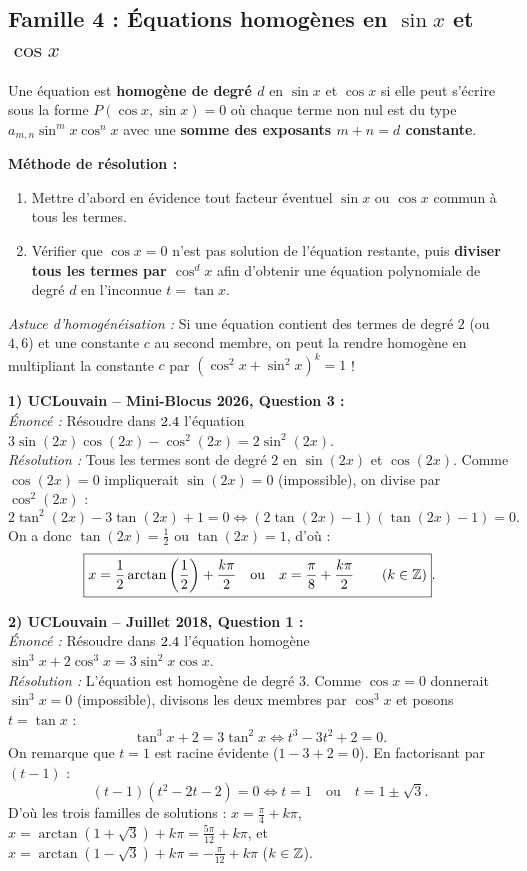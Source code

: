 \subsection{Famille 4 : Équations homogènes en $\sin x$ et $\cos x$}

\begin{definition}
Une équation est \textbf{homogène de degré $d$} en $\sin x$ et $\cos x$ si elle peut s'écrire sous la forme $P(\cos x, \sin x) = 0$ où chaque terme non nul est du type $a_{m,n} \sin^m x \cos^n x$ avec une \textbf{somme des exposants $m + n = d$ constante}.

\textbf{Méthode de résolution :}
\begin{enumerate}
    \item Mettre d'abord en évidence tout facteur éventuel $\sin x$ ou $\cos x$ commun à tous les termes.
    \item Vérifier que $\cos x = 0$ n'est pas solution de l'équation restante, puis \textbf{diviser tous les termes par $\cos^d x$} afin d'obtenir une équation polynomiale de degré $d$ en l'inconnue $t = \tan x$.
\end{enumerate}
\emph{Astuce d'homogénéisation :} Si une équation contient des termes de degré $2$ (ou $4, 6$) et une constante $c$ au second membre, on peut la rendre homogène en multipliant la constante $c$ par $(\cos^2 x + \sin^2 x)^k = 1$ !
\end{definition}

\begin{exemple}
\textbf{1) UCLouvain -- Mini-Blocus 2026, Question 3 :}\\
\emph{Énoncé :} Résoudre dans $2.4$ l'équation $3\sin(2x)\cos(2x) - \cos^2(2x) = 2\sin^2(2x)$.\\
\emph{Résolution :} Tous les termes sont de degré $2$ en $\sin(2x)$ et $\cos(2x)$. Comme $\cos(2x) = 0$ impliquerait $\sin(2x) = 0$ (impossible), on divise par $\cos^2(2x)$ :
\[
    2\tan^2(2x) - 3\tan(2x) + 1 = 0 \iff (2\tan(2x) - 1)(\tan(2x) - 1) = 0.
\]
On a donc $\tan(2x) = \frac{1}{2}$ ou $\tan(2x) = 1$, d'où :
\[
    \boxed{x = \frac{1}{2}\arctan\left(\frac{1}{2}\right) + \frac{k\pi}{2} \quad \text{ou} \quad x = \frac{\pi}{8} + \frac{k\pi}{2} \qquad (k \in \mathbb{Z})}.
\]

\medskip
\textbf{2) UCLouvain -- Juillet 2018, Question 1 :}\\
\emph{Énoncé :} Résoudre dans $2.4$ l'équation homogène $\sin^3 x + 2\cos^3 x = 3\sin^2 x \cos x$.\\
\emph{Résolution :} L'équation est homogène de degré $3$. Comme $\cos x = 0$ donnerait $\sin^3 x = 0$ (impossible), divisons les deux membres par $\cos^3 x$ et posons $t = \tan x$ :
\[
    \tan^3 x + 2 = 3\tan^2 x \iff t^3 - 3t^2 + 2 = 0.
\]
On remarque que $t = 1$ est racine évidente ($1 - 3 + 2 = 0$). En factorisant par $(t-1)$ :
\[
    (t - 1)(t^2 - 2t - 2) = 0 \iff t = 1 \quad \text{ou} \quad t = 1 \pm \sqrt{3}.
\]
D'où les trois familles de solutions : $x = \frac{\pi}{4} + k\pi$, $x = \arctan(1+\sqrt{3}) + k\pi = \frac{5\pi}{12} + k\pi$, et $x = \arctan(1-\sqrt{3}) + k\pi = -\frac{\pi}{12} + k\pi$ ($k \in \mathbb{Z}$).
\end{exemple}

